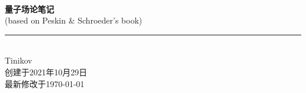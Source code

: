 \documentclass[10pt,b5paper, openany]{book} %
\newcommand{\HRule}{\rule{\linewidth}{0.5mm}}
\begin{document}
\pagestyle{fancy}

\begin{titlepage}
  \centering

  \mbox{} \\[-0.3cm]

  {\bfseries \fontsize{32pt}{1pt} 量子场论笔记} \\[0.2cm]

  (\large based on Peskin \& Schroeder's book) \\[0.8cm]

  \HRule \\[0.8cm]

  {\Large Tinikov} \\[0.3cm]

  {\small 创建于2021年10月29日} \\[-0.1cm]

  {\small 最新修改于\today} \\[0.4cm]

\end{titlepage}

\setcounter{page}{1}

\clearpage

{}
\tableofcontents
\clearpage
\end{document}
